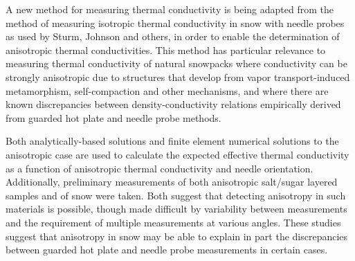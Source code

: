 A new method for measuring thermal conductivity is being adapted from 
the method of measuring isotropic thermal conductivity in snow with needle
probes as used by Sturm, Johnson and others, in order to enable the
determination of anisotropic thermal conductivities. This
method has particular relevance to measuring thermal conductivity of natural
snowpacks where conductivity can be strongly anisotropic due to structures that
develop from vapor transport-induced metamorphism, self-compaction and other
mechanisms, and where there are known discrepancies between density-conductivity
relations empirically derived from guarded hot plate and needle probe methods.

Both analytically-based solutions and finite element numerical solutions to the
anisotropic case are used to calculate the expected effective thermal
conductivity as a function of anisotropic thermal conductivity and needle
orientation. Additionally, preliminary measurements of both anisotropic salt/sugar
layered samples and of snow were taken. Both suggest that detecting anisotropy
in such materials is possible, though made difficult by variability between
measurements and the requirement of multiple
measurements at various angles. These studies suggest that
anisotropy in snow may be able to explain in part the discrepancies between
guarded hot plate and needle probe measurements in certain cases.
